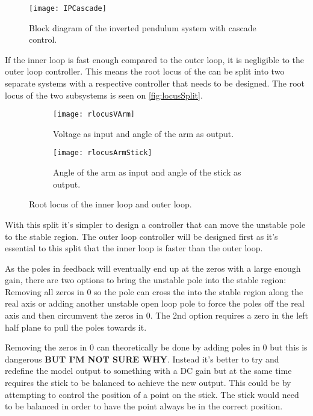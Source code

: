 \begin{figure}[htbp]
\centering
\texttt{[image: IPCascade]}
\caption{Block diagram of the inverted pendulum system with cascade control.}
\label{fig:IPCascade}
\end{figure}

If the inner loop is fast enough compared to the outer loop, it is negligible to the outer loop controller. This means the root locus of the can be split into two separate systems with a respective controller that needs to be designed. The root locus of the two subsystems is seen on \autoref{fig:locusSplit}.
\begin{figure}[htbp]
\centering
	\begin{subfigure}{0.45\textwidth}
	\texttt{[image: rlocusVArm]}
	\caption{Voltage as input and angle of the arm as output.}
	\end{subfigure}
	\begin{subfigure}{0.45\textwidth}
	\texttt{[image: rlocusArmStick]}
	\caption{Angle of the arm as input and angle of the stick as output.}
	\end{subfigure}
\caption{Root locus of the inner loop and outer loop.}
\label{fig:locusSplit}
\end{figure}

With this split it's simpler to design a controller that can move the unstable pole to the stable region. The outer loop controller will be designed first as it's essential to this split that the inner loop is faster than the outer loop. 

As the poles in feedback will eventually end up at the zeros with a large enough gain, there are two options to bring the unstable pole into the stable region: Removing all zeros in 0 so the pole can cross the into the stable region along the real axis or adding another unstable open loop pole to force the poles off the real axis and then circumvent the zeros in 0. The 2nd option requires a zero in the left half plane to pull the poles towards it.

Removing the zeros in 0 can theoretically be done by adding poles in 0 but this is dangerous \textbf{BUT I'M NOT SURE WHY}. Instead it's better to try and redefine the model output to something with a DC gain but at the same time requires the stick to be balanced to achieve the new output. This could be by attempting to control the position of a point on the stick. The stick would need to be balanced in order to have the point always be in the correct position.


